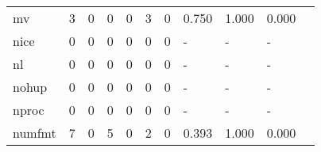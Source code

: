 \begin{longtable}{lp{1.2cm}p{1.2cm}p{1.2cm}p{1.2cm}p{1.2cm}p{1.2cm}p{1.2cm}p{1.2cm}p{1.2cm}p{1.2cm}}
mv        &                                     3 &                                                  0 &                                                  0 &                                                  0 &                                                  3 &                                                  0 &                                              0.750 &                                              1.000 &                                              0.000 \\
nice      &                                     0 &                                                  0 &                                                  0 &                                                  0 &                                                  0 &                                                  0 &                                                  - &                                                  - &                                                  - \\
nl        &                                     0 &                                                  0 &                                                  0 &                                                  0 &                                                  0 &                                                  0 &                                                  - &                                                  - &                                                  - \\
nohup     &                                     0 &                                                  0 &                                                  0 &                                                  0 &                                                  0 &                                                  0 &                                                  - &                                                  - &                                                  - \\
nproc     &                                     0 &                                                  0 &                                                  0 &                                                  0 &                                                  0 &                                                  0 &                                                  - &                                                  - &                                                  - \\
numfmt    &                                     7 &                                                  0 &                                                  5 &                                                  0 &                                                  2 &                                                  0 &                                              0.393 &                                              1.000 &                                              0.000 \\

\end{longtable}
